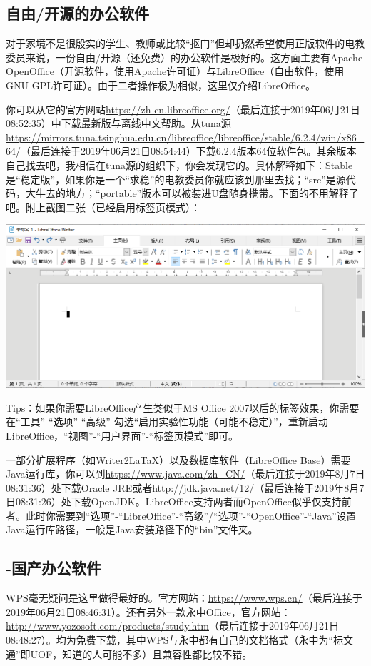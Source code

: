 \subsection{自由/开源的办公软件}
对于家境不是很殷实的学生、教师或比较“抠门”但却扔然希望使用正版软件的电教委员来说，一份自由/开源（还免费）的办公软件是极好的。这方面主要有Apache OpenOffice（开源软件，使用Apache许可证）与LibreOffice（自由软件，使用GNU GPL许可证）。由于二者操作极为相似，这里仅介绍LibreOffice。\par
你可以从它的官方网站\url{https://zh-cn.libreoffice.org/}（最后连接于2019年06月21日08:52:35）中下载最新版与离线中文帮助。从tuna源\url{https://mirrors.tuna.tsinghua.edu.cn/libreoffice/libreoffice/stable/6.2.4/win/x86_64/}（最后连接于2019年06月21日08:54:44）下载6.2.4版本64位软件包。其余版本自己找去吧，我相信在tuna源的组织下，你会发现它的。具体解释如下：Stable是“稳定版”，如果你是一个“求稳”的电教委员你就应该到那里去找；“src”是源代码，大牛去的地方；“portable”版本可以被装进U盘随身携带。下面的不用解释了吧。附上截图二张（已经启用标签页模式）：
\begin{center}
	\includegraphics[scale=0.7]{pic/loffice_wr}
\end{center} \par
Tips：如果你需要LibreOffice产生类似于MS Office 2007以后的标签效果，你需要在“工具”-“选项”-“高级”-勾选“启用实验性功能（可能不稳定）”，重新启动LibreOffice，“视图”-“用户界面”-“标签页模式”即可。\par
一部分扩展程序（如Writer2LaTaX）以及数据库软件（LibreOffice Base）需要Java运行库，你可以到\url{https://www.java.com/zh_CN/}（最后连接于2019年8月7日08:31:36）处下载Oracle JRE或者\url{http://jdk.java.net/12/}（最后连接于2019年8月7日08:31:26）处下载OpenJDK。LibreOffice支持两者而OpenOffice似乎仅支持前者。此时你需要到“选项”-“LibreOffice”-“高级”/“选项”-“OpenOffice”-“Java”设置Java运行库路径，一般是Java安装路径下的“bin”文件夹。
\subsection{-国产办公软件}
WPS毫无疑问是这里做得最好的。官方网站：\url{https://www.wps.cn/}（最后连接于2019年06月21日08:46:31）。还有另外一款永中Office，官方网站：\url{http://www.yozosoft.com/products/study.htm}（最后连接于2019年06月21日08:48:27）。均为免费下载，其中WPS与永中都有自己的文档格式（永中为“标文通”即UOF，知道的人可能不多）且兼容性都比较不错。
